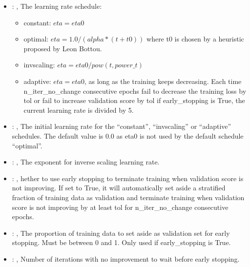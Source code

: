 \begin{itemize}
    \item {}: ,
      The learning rate schedule:                                                  \begin{itemize}
      \item constant: $eta = eta0$                                                   \item optimal:
      $eta = 1.0 / (alpha * (t + t0))$ where t0 is chosen by a heuristic proposed by Leon Bottou.
      \item invscaling: $eta = eta0 / pow(t, power\_t)$
      \item adaptive: $eta = eta0$, as long as the training keeps decreasing. Each time
      n\_iter\_no\_change consecutive epochs fail
      to decrease the training loss by tol or fail to increase validation score by tol if
      early\_stopping is True, the current
      learning rate is divided by 5.                                                  \end{itemize}

    \item {}: ,
      The initial learning rate for the ``constant'', ``invscaling'' or ``adaptive'' schedules. The
      default value is 0.0                                                  as eta0 is not used by
      the default schedule ``optimal''.

    \item {}: ,
      The exponent for inverse scaling learning rate.

    \item {}: ,
      hether to use early stopping to terminate training when validation score is not
      improving. If set to True, it will automatically set aside a stratified fraction of training
      data as validation and terminate training when validation score is not improving by at least
      tol for n\_iter\_no\_change consecutive epochs.

    \item {}: ,
      The proportion of training data to set aside as validation set for early stopping.
      Must be between 0 and 1. Only used if early\_stopping is True.

    \item {}: ,
      Number of iterations with no improvement to wait before early stopping.


\end{itemize}
